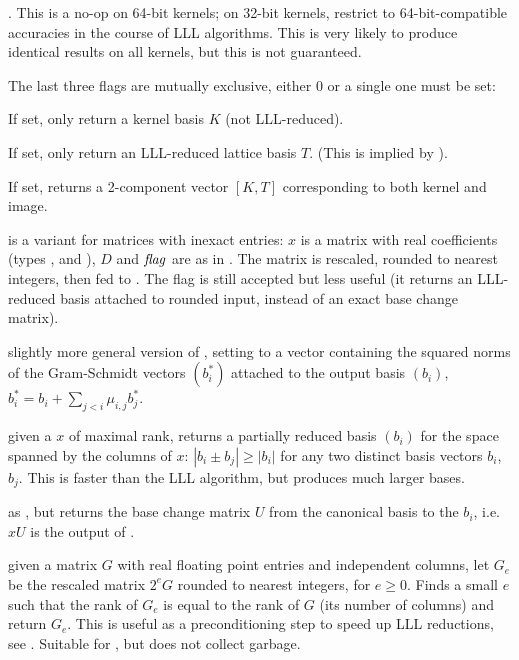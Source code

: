 \item  {}. This is a no-op on 64-bit kernels; on 32-bit
kernels, restrict to 64-bit-compatible accuracies in the course of LLL
algorithms. This is very likely to produce identical results on all
kernels, but this is not guaranteed.

The last three flags are mutually exclusive, either 0 or a single one must be
set:

\item  {} If set, only return a kernel basis $K$ (not LLL-reduced).

\item  {} If set, only return an LLL-reduced lattice basis $T$.
(This is implied by ).

\item  {} If set, returns a 2-component vector $[K, T]$
corresponding to both kernel and image.


 is a variant for matrices
with inexact entries: $x$ is a matrix with real coefficients (types
,  and ), $D$ and $\hbox{\it f\kern0pt lag\/}$ are as in .
The matrix is rescaled, rounded to nearest integers, then fed to
. The flag  is still accepted but less useful
(it returns an LLL-reduced basis attached to rounded input, instead of an
exact base change matrix).

 slightly more
general version of , setting  to a vector containing
the squared norms of the Gram-Schmidt vectors $(b_i^*)$ attached to the
output basis $(b_i)$, $b_i^* = b_i + \sum_{j < i} \mu_{i,j} b_j^*$.


 given a  $x$ of maximal rank,
returns a partially reduced basis $(b_i)$ for the space spanned by the
columns of $x$: $|b_i \pm b_j| \geq |b_i|$ for any two distinct basis vectors
$b_i$, $b_j$. This is faster than the LLL algorithm, but produces much larger
bases.

 as , but returns
the base change matrix $U$ from the canonical basis to the $b_i$, i.e. $x U$
is the output of .

 given a matrix $G$ with real floating
point entries and independent columns, let $G_e$ be the
rescaled matrix $2^e G$ rounded to nearest integers, for $e \geq 0$.
Finds a small $e$ such that the rank of $G_e$ is equal to the rank of $G$
(its number of columns) and return $G_e$. This is useful as a preconditioning
step to speed up LLL reductions, see .
Suitable for , but does not collect garbage.

